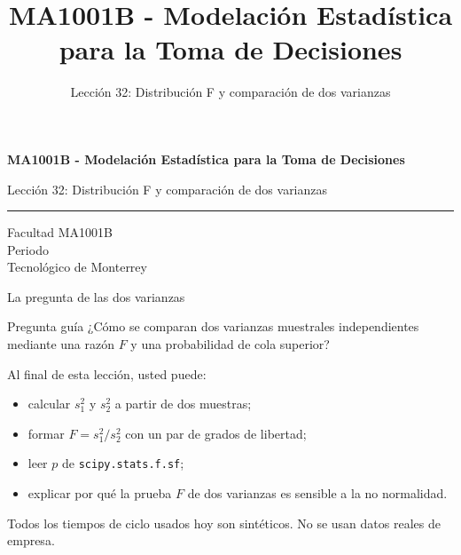\documentclass[aspectratio=169,10pt,spanish]{beamer}
\title{MA1001B - Modelación Estadística para la Toma de Decisiones}
\subtitle{Lección 32: Distribución F y comparación de dos varianzas}
\author{}
\institute{Tecnol\'ogico de Monterrey}
\date{}
\begin{document}
\begin{frame}[plain]
  \vspace{1.2cm}
  {\Large\bfseries MA1001B - Modelación Estadística para la Toma de Decisiones\par}
  \vspace{0.7cm}
  {\large Lección 32: Distribución F y comparación de dos varianzas\par}
  \vspace{0.7cm}
  {\color{TecRojo}\rule{\textwidth}{1.2pt}}
  \vspace{0.8cm}

  Facultad MA1001B\\[0.3cm]
  Periodo\\[0.3cm]
  Tecnol\'ogico de Monterrey
\end{frame}

\begin{frame}{La pregunta de las dos varianzas}
  \begin{alertblock}{Pregunta guía}
    ¿Cómo se comparan dos varianzas muestrales independientes mediante una
    razón $F$ y una probabilidad de cola superior?
  \end{alertblock}

  \vspace{0.6em}
  Al final de esta lección, usted puede:
  \begin{itemize}
    \item calcular $s_{1}^{2}$ y $s_{2}^{2}$ a partir de dos muestras;
    \item formar $F=s_{1}^{2}/s_{2}^{2}$ con un par de grados de libertad;
    \item leer $p$ de \texttt{scipy.stats.f.sf};
    \item explicar por qué la prueba $F$ de dos varianzas es sensible a la no
      normalidad.
  \end{itemize}

  \vfill
  \scriptsize Todos los tiempos de ciclo usados hoy son sintéticos. No se usan datos reales de empresa.
\end{frame}
\end{document}
